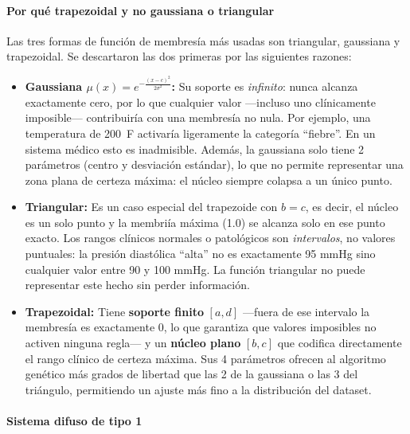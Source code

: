 \documentclass[11pt]{article}
\begin{document}
\paragraph{Por qué trapezoidal y no gaussiana o triangular}

Las tres formas de funci\'on de membres\'ia m\'as usadas son triangular, gaussiana y trapezoidal. Se descartaron las dos primeras por las siguientes razones:

\begin{itemize}
    \item \textbf{Gaussiana $\mu(x) = e^{-\frac{(x-c)^2}{2\sigma^2}}$:} Su soporte es \textit{infinito}: nunca alcanza exactamente cero, por lo que cualquier valor ---incluso uno cl\'inicamente imposible--- contribuir\'ia con una membres\'ia no nula. Por ejemplo, una temperatura de 200~\textdegree{}F activar\'ia ligeramente la categor\'ia ``fiebre''. En un sistema m\'edico esto es inadmisible. Adem\'as, la gaussiana solo tiene 2 par\'ametros (centro y desviaci\'on est\'andar), lo que no permite representar una zona plana de certeza m\'axima: el n\'ucleo siempre colapsa a un \'unico punto.

    \item \textbf{Triangular:} Es un caso especial del trapezoide con $b = c$, es decir, el n\'ucleo es un solo punto y la membri\'ia m\'axima (1.0) se alcanza solo en ese punto exacto. Los rangos cl\'inicos normales o patol\'ogicos son \textit{intervalos}, no valores puntuales: la presi\'on diast\'olica ``alta'' no es exactamente 95 mmHg sino cualquier valor entre 90 y 100 mmHg. La funci\'on triangular no puede representar este hecho sin perder informaci\'on.

    \item \textbf{Trapezoidal:} Tiene \textbf{soporte finito} $[a, d]$ ---fuera de ese intervalo la membres\'ia es exactamente 0, lo que garantiza que valores imposibles no activen ninguna regla--- y un \textbf{n\'ucleo plano} $[b, c]$ que codifica directamente el rango cl\'inico de certeza m\'axima. Sus 4 par\'ametros ofrecen al algoritmo gen\'etico m\'as grados de libertad que las 2 de la gaussiana o las 3 del tri\'angulo, permitiendo un ajuste m\'as fino a la distribuci\'on del dataset.
\end{itemize}

\paragraph{Sistema difuso de tipo 1}
\end{document}

